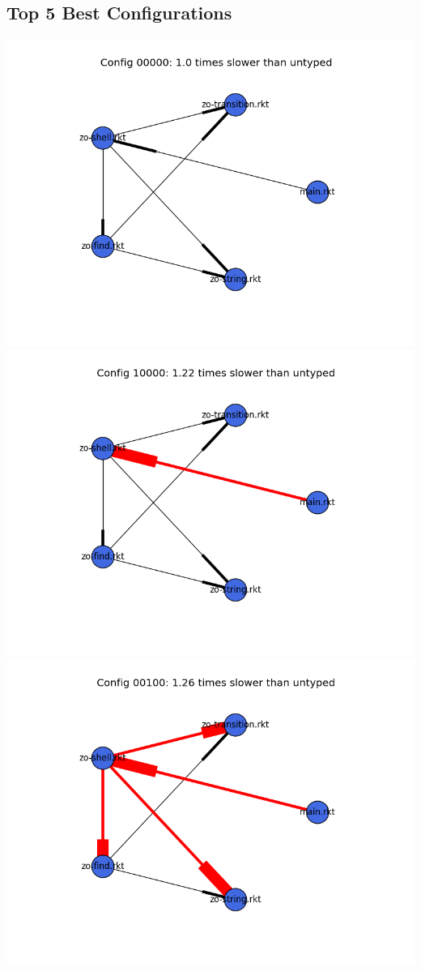 \documentclass{article}
\begin{document}
\begin{itemize}
\subsection{Top 5 Best Configurations}
\includegraphics[width=\textwidth]{zordoz-module-graph-00000.png}
\includegraphics[width=\textwidth]{zordoz-module-graph-10000.png}
\includegraphics[width=\textwidth]{zordoz-module-graph-00100.png}

\end{itemize}
\end{document}
